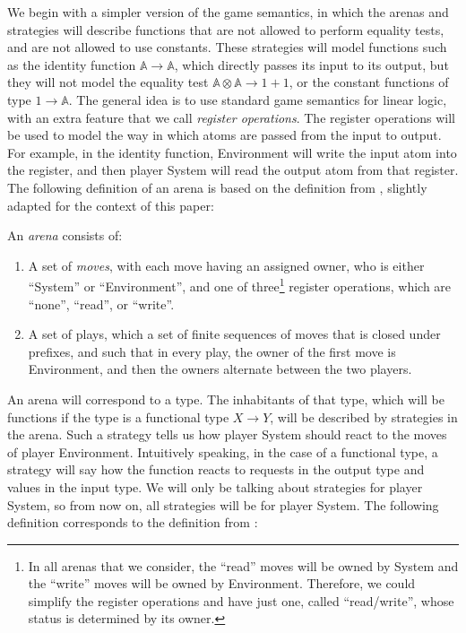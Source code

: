 \documentclass[10pt,a4paper]{amsart}
\numberwithin{equation}{section}
\theoremstyle{plain}
\newcommand{\atoms}{\mathbb A}
\begin{document}
We begin with a simpler version of the game semantics, in which the arenas and strategies will describe functions that are not allowed to perform equality tests, and are not allowed to use constants. These strategies will model functions such as the identity function $\atoms \to \atoms$, which directly passes its input to its output, but they  will not model the equality test $\atoms \otimes \atoms \to 1 + 1$, or the constant functions of type $1 \to \atoms$. The general idea is to use standard game semantics for linear logic, with an extra feature that we call \emph{register operations}. The register operations will be used to model the way in which atoms are passed from the input to output. For example, in the identity function,  Environment will  write the input atom into the register, and then player System will read the output atom from that register. The following definition of an arena is based on the definition from \cite[p.4]{abramsky2013semantics}, slightly
adapted for the context of this paper:
\begin{definition}[Arena] \label{def:arena}
    An \emph{arena} consists of:
    \begin{enumerate}
        \item A set of \emph{moves}, with each move having an assigned owner, who is either ``System'' or ``Environment'', and one of three\footnote{\label{footnote:read-write} In all arenas that we consider, the ``read'' moves will be owned by System and the ``write'' moves will be owned by Environment. Therefore, we could simplify the register operations and have just one, called ``read/write'', whose status is determined by its owner. 
        } register operations, which are ``none'', ``read'', or ``write''.
                \item A set of plays, which a set of finite sequences of moves that is closed under prefixes, and such that in every play, the owner of the first move is Environment, and then the owners alternate between the two players.
    \end{enumerate}
\end{definition}




An arena will correspond to a type. The inhabitants of that type, which will be  functions if the type is a functional type $X \to Y$, will be described by strategies in the arena. Such a strategy tells us how player System should react to the moves of player Environment. Intuitively speaking, in the case of a functional type, a strategy will say how the function reacts to requests in the output type and values in the input type. We will only be talking about strategies for player System, so from now on, all strategies will be for player System. The following definition corresponds to the definition from \cite[p.5]{abramsky2013semantics}:
\end{document}
